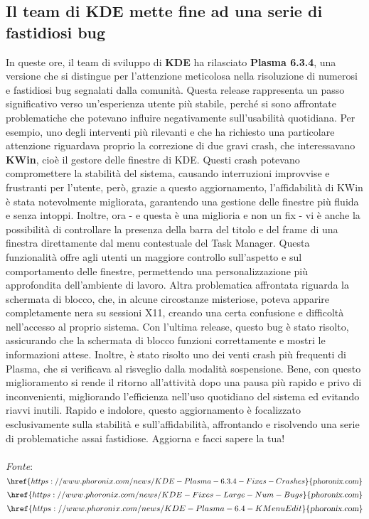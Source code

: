 \documentclass[a4paper,twoside]{article}
\begin{document}
\subsection{Il team di KDE mette fine ad una serie di fastidiosi bug}
In queste ore, il team di sviluppo di \textbf{KDE} ha rilasciato \textbf{Plasma 6.3.4}, una versione che si distingue per l'attenzione meticolosa nella risoluzione di numerosi e fastidiosi bug segnalati dalla comunità. Questa release rappresenta un passo significativo verso un'esperienza utente più stabile, perché si sono affrontate problematiche che potevano influire negativamente sull'usabilità quotidiana. Per esempio, uno degli interventi più rilevanti e che ha richiesto una particolare attenzione riguardava proprio la correzione di due gravi crash, che interessavano \textbf{KWin}, cioè il gestore delle finestre di KDE. Questi crash potevano compromettere la stabilità del sistema, causando interruzioni improvvise e frustranti per l'utente, però, grazie a questo aggiornamento, l'affidabilità di KWin è stata notevolmente migliorata, garantendo una gestione delle finestre più fluida e senza intoppi. Inoltre, ora - e questa è una miglioria e non un fix - vi è anche la possibilità di controllare la presenza della barra del titolo e del frame di una finestra direttamente dal menu contestuale del Task Manager. Questa funzionalità offre agli utenti un maggiore controllo sull'aspetto e sul comportamento delle finestre, permettendo una personalizzazione più approfondita dell'ambiente di lavoro. Altra problematica affrontata riguarda la schermata di blocco, che, in alcune circostanze misteriose, poteva apparire completamente nera su sessioni X11, creando una certa confusione e difficoltà nell'accesso al proprio sistema. Con l'ultima release, questo bug è stato risolto, assicurando che la schermata di blocco funzioni correttamente e mostri le informazioni attese.
Inoltre, è stato risolto uno dei venti crash più frequenti di Plasma, che si verificava al risveglio dalla modalità sospensione. Bene, con questo miglioramento si rende il ritorno all'attività dopo una pausa più rapido e privo di inconvenienti, migliorando l'efficienza nell'uso quotidiano del sistema ed evitando riavvi inutili. Rapido e indolore, questo aggiornamento è focalizzato esclusivamente sulla stabilità e sull'affidabilità, affrontando e risolvendo una serie di problematiche assai fastidiose. Aggiorna e facci sapere la tua!\\
\\
\textit{Fonte}:\\
$\href{https://www.phoronix.com/news/KDE-Plasma-6.3.4-Fixes-Crashes}{\textsl{phoronix.com}}$\\
$\href{https://www.phoronix.com/news/KDE-Fixes-Large-Num-Bugs}{\textsl{phoronix.com}}$\\
$\href{https://www.phoronix.com/news/KDE-Plasma-6.4-KMenuEdit}{\textsl{phoronix.com}}$
\end{document}
